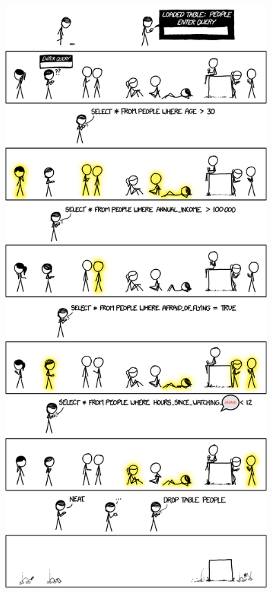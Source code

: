\documentclass{42-en}
\begin{document}
            \begin{figure}[H]
                \begin{center}
                    \includegraphics[width=10cm]{query_2x.png}
                \end{center}
            \end{figure}

	    	\newpage 	

\end{document}

